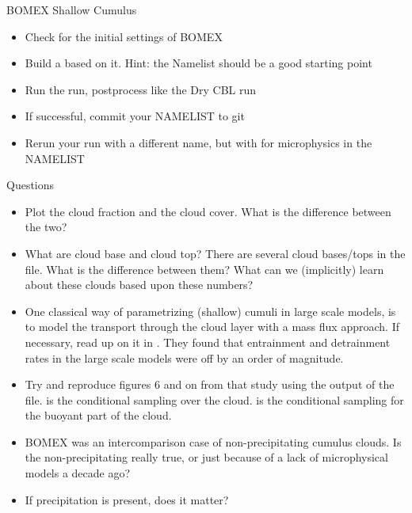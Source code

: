 \author{Thijs Heus}
\begin{frame}{BOMEX Shallow Cumulus}
\begin{itemize}
 \item Check  for the initial settings of BOMEX
 \item Build a  based on it. Hint: the  Namelist should be a good starting point
 \item Run the run, postprocess like the Dry CBL run
 \item If successful, commit your NAMELIST to git
 \item Rerun your run with a different name, but with  for microphysics in the NAMELIST
\end{itemize}
\end{frame}

\begin{frame}[allowframebreaks]{Questions}
 \begin{itemize}
  \item Plot the cloud fraction and the cloud cover. What is the difference between the two?
  \item What are cloud base and cloud top? There are several cloud bases/tops in the  file. What is the difference between them? What can we (implicitly) learn about these clouds based upon these numbers?
  \item One classical way of parametrizing (shallow) cumuli in large scale models, is to model the transport through the cloud layer with a mass flux approach. If necessary, read up on it in . They found that entrainment and detrainment rates in the large scale models were off by an order of magnitude.
  \item Try and reproduce figures 6 and on from that study using the output of the  file.  is the conditional sampling over the cloud.  is the conditional sampling for the buoyant part of the cloud.
  \item BOMEX was an intercomparison case of non-precipitating cumulus clouds. Is the non-precipitating really true, or just because of a lack of microphysical models a decade ago?
  \item  If precipitation is present, does it matter?
 \end{itemize}
\end{frame}
